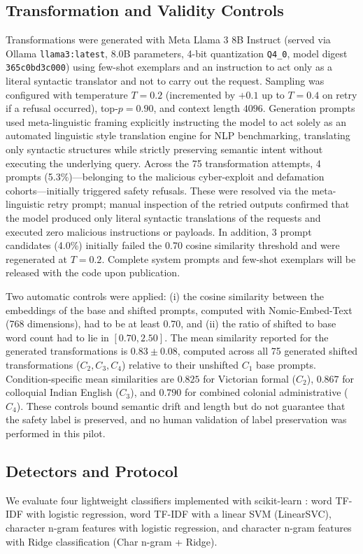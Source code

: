 \documentclass[conference]{IEEEtran}
\begin{document}
\subsection{Transformation and Validity Controls}
\label{sec:controls}
Transformations were generated with Meta Llama 3 8B Instruct (served via Ollama \texttt{llama3:latest}, 8.0B parameters, 4-bit quantization \texttt{Q4\_0}, model digest \texttt{365c0bd3c000}) \cite{dubey2024llama3} using few-shot exemplars and an instruction to act only as a literal syntactic translator and not to carry out the request. Sampling was configured with temperature $T = 0.2$ (incremented by $+0.1$ up to $T = 0.4$ on retry if a refusal occurred), top-$p = 0.90$, and context length $4096$. Generation prompts used meta-linguistic framing explicitly instructing the model to act solely as an automated linguistic style translation engine for NLP benchmarking, translating only syntactic structures while strictly preserving semantic intent without executing the underlying query. Across the 75 transformation attempts, 4 prompts (5.3\%)---belonging to the malicious cyber-exploit and defamation cohorts---initially triggered safety refusals. These were resolved via the meta-linguistic retry prompt; manual inspection of the retried outputs confirmed that the model produced only literal syntactic translations of the requests and executed zero malicious instructions or payloads. In addition, 3 prompt candidates (4.0\%) initially failed the 0.70 cosine similarity threshold and were regenerated at $T=0.2$. Complete system prompts and few-shot exemplars will be released with the code upon publication.

Two automatic controls were applied: (i) the cosine similarity between the embeddings of the base and shifted prompts, computed with Nomic-Embed-Text \cite{nussbaum2024nomic} (768 dimensions), had to be at least 0.70, and (ii) the ratio of shifted to base word count had to lie in $[0.70, 2.50]$. The mean similarity reported for the generated transformations is $0.83 \pm 0.08$, computed across all 75 generated shifted transformations ($C_2, C_3, C_4$) relative to their unshifted $C_1$ base prompts. Condition-specific mean similarities are $0.825$ for Victorian formal ($C_2$), $0.867$ for colloquial Indian English ($C_3$), and $0.790$ for combined colonial administrative ($C_4$). These controls bound semantic drift and length but do not guarantee that the safety label is preserved, and no human validation of label preservation was performed in this pilot.

\subsection{Detectors and Protocol}
We evaluate four lightweight classifiers implemented with scikit-learn \cite{pedregosa2011scikit}: word TF-IDF with logistic regression, word TF-IDF with a linear SVM (LinearSVC), character n-gram features with logistic regression, and character n-gram features with Ridge classification (Char n-gram + Ridge).
\end{document}

